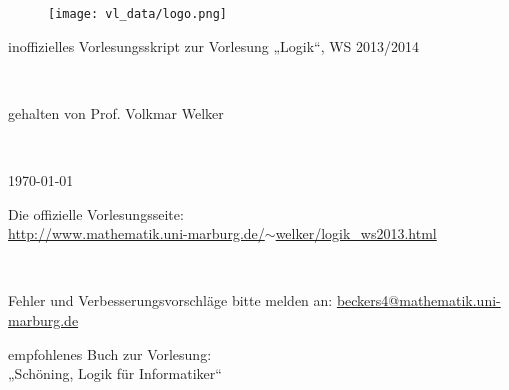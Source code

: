\documentclass[a4paper, titlepage]{scrartcl}
\begin{document}


\begin{figure}[h]
\centering
\texttt{[image: vl\_data/logo.png]}
\end{figure}

\begin{center}
\begin{huge}inoffizielles Vorlesungsskript zur Vorlesung „Logik“, WS 2013/2014\end{huge}\\
\vspace{1cm}
\begin{large}gehalten von Prof. Volkmar Welker\end{large}\\
\vspace{1cm}
\begin{Large}\today \end{Large}
\end{center}

\noindent
\begin{center}
Die offizielle Vorlesungsseite:\\
\href{http://www.mathematik.uni-marburg.de/~welker/logik\_ws2013.html}{http://www.mathematik.uni-marburg.de/$\sim$welker/logik\_ws2013.html}
\end{center}

\noindent\\
\begin{center}\begin{Large}Fehler und Verbesserungsvorschläge bitte melden an: \href{mailto:beckers4@mathematik.uni-marburg.de}{beckers4@mathematik.uni-marburg.de}\end{Large}\end{center}
\vspace{1cm}
\begin{center}
empfohlenes Buch zur Vorlesung:\\
„Schöning, Logik für Informatiker“
\end{center}

\newpage

\tableofcontents

\newpage





\newpage

\end{document}
